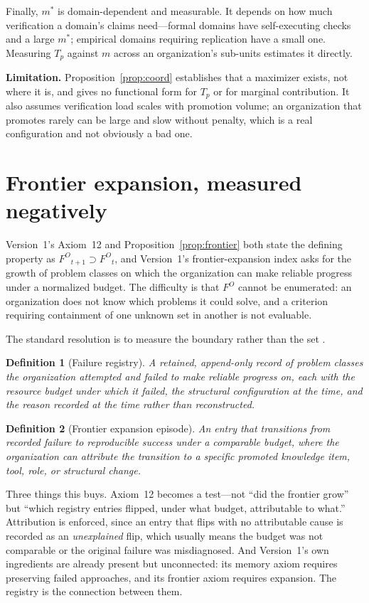 \documentclass[11pt]{article}
\newtheorem{definition}{Definition}
\newcommand{\Fo}{\ensuremath{F^O}}
\newcommand{\Tp}{\ensuremath{T_p}}
\begin{document}
Finally, $m^*$ is domain-dependent and measurable. It depends on how much verification a domain's claims need---formal domains have self-executing checks and a large $m^*$; empirical domains requiring replication have a small one. Measuring $\Tp$ against $m$ across an organization's sub-units estimates it directly.

\textbf{Limitation.} Proposition~\ref{prop:coord} establishes that a maximizer exists, not where it is, and gives no functional form for $\Tp$ or for marginal contribution. It also assumes verification load scales with promotion volume; an organization that promotes rarely can be large and slow without penalty, which is a real configuration and not obviously a bad one.

\section{Frontier expansion, measured negatively}\label{sec:registry}

Version~1's Axiom~12 and Proposition~\ref{prop:frontier} both state the defining property as $\Fo_{t+1} \supset \Fo_t$, and Version~1's frontier-expansion index asks for the growth of problem classes on which the organization can make reliable progress under a normalized budget. The difficulty is that $\Fo$ cannot be enumerated: an organization does not know which problems it could solve, and a criterion requiring containment of one unknown set in another is not evaluable.

The standard resolution is to measure the boundary rather than the set \citep{popper1959logic}.

\begin{definition}[Failure registry]
A retained, append-only record of problem classes the organization attempted and failed to make reliable progress on, each with the resource budget under which it failed, the structural configuration at the time, and the reason recorded at the time rather than reconstructed.
\end{definition}

\begin{definition}[Frontier expansion episode]
An entry that transitions from recorded failure to reproducible success under a comparable budget, where the organization can attribute the transition to a specific promoted knowledge item, tool, role, or structural change.
\end{definition}

Three things this buys. Axiom~12 becomes a test---not ``did the frontier grow'' but ``which registry entries flipped, under what budget, attributable to what.'' Attribution is enforced, since an entry that flips with no attributable cause is recorded as an \emph{unexplained} flip, which usually means the budget was not comparable or the original failure was misdiagnosed. And Version~1's own ingredients are already present but unconnected: its memory axiom requires preserving failed approaches, and its frontier axiom requires expansion. The registry is the connection between them.
\end{document}
